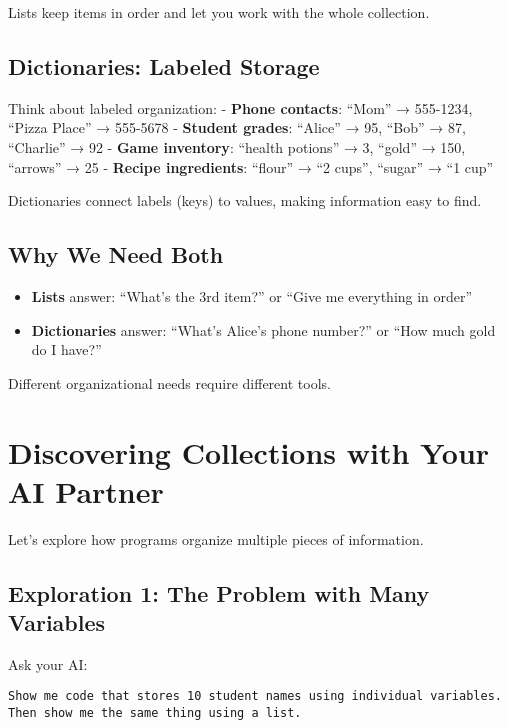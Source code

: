 \documentclass[
  letterpaper,
  DIV=11,
  numbers=noendperiod,
  oneside]{scrreprt}
\providecommand{\tightlist}{%
  \setlength{\itemsep}{0pt}\setlength{\parskip}{0pt}}\usepackage{longtable,booktabs,array}
\begin{document}
Lists keep items in order and let you work with the whole collection.

\subsection{Dictionaries: Labeled
Storage}\label{dictionaries-labeled-storage}

Think about labeled organization: - \textbf{Phone contacts}: ``Mom'' →
555-1234, ``Pizza Place'' → 555-5678 - \textbf{Student grades}:
``Alice'' → 95, ``Bob'' → 87, ``Charlie'' → 92 - \textbf{Game
inventory}: ``health potions'' → 3, ``gold'' → 150, ``arrows'' → 25 -
\textbf{Recipe ingredients}: ``flour'' → ``2 cups'', ``sugar'' → ``1
cup''

Dictionaries connect labels (keys) to values, making information easy to
find.

\subsection{Why We Need Both}\label{why-we-need-both}

\begin{itemize}
\tightlist
\item
  \textbf{Lists} answer: ``What's the 3rd item?'' or ``Give me
  everything in order''
\item
  \textbf{Dictionaries} answer: ``What's Alice's phone number?'' or
  ``How much gold do I have?''
\end{itemize}

Different organizational needs require different tools.

\section{Discovering Collections with Your AI
Partner}\label{discovering-collections-with-your-ai-partner}

Let's explore how programs organize multiple pieces of information.

\subsection{Exploration 1: The Problem with Many
Variables}\label{exploration-1-the-problem-with-many-variables}

Ask your AI:

\begin{verbatim}
Show me code that stores 10 student names using individual variables. 
Then show me the same thing using a list.
\end{verbatim}
\end{document}
